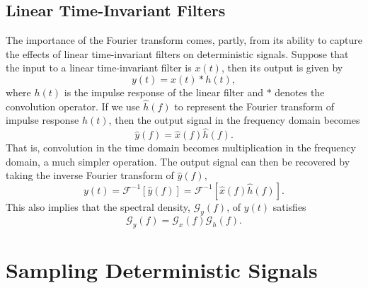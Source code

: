 \subsection{Linear Time-Invariant Filters}
\label{subsection:LinearTimeInvariantFilters}

The importance of the Fourier transform comes, partly, from its ability to capture the effects of linear time-invariant filters on deterministic signals.
Suppose that the input to a linear time-invariant filter is $x(t)$, then its output is given by
\begin{equation*}
y(t) = x(t) \ast h(t),
\end{equation*}
where $h(t)$ is the impulse response of the linear filter and $\ast$ denotes the convolution operator.
If we use $\hat{h}(f)$ to represent the Fourier transform of impulse response $h(t)$, then the output signal in the frequency domain becomes
\begin{equation*}
\hat{y}(f) = \hat{x}(f) \hat{h}(f) .
\end{equation*}
That is, convolution in the time domain becomes multiplication in the frequency domain, a much simpler operation.
The output signal can then be recovered by taking the inverse Fourier transform of $\hat{y}(f)$,
\begin{equation*}
y(t) = \mathcal{F}^{-1} [ \hat{y}(f) ] = \mathcal{F}^{-1} [ \hat{x}(f) \hat{h}(f) ] .
\end{equation*}
This also implies that the spectral density, $\mathcal{G}_y(f)$, of $y(t)$ satisfies
\[ \mathcal{G}_y(f) = \mathcal{G}_x(f) \mathcal{G}_h(f). \]

\section{Sampling Deterministic Signals}

